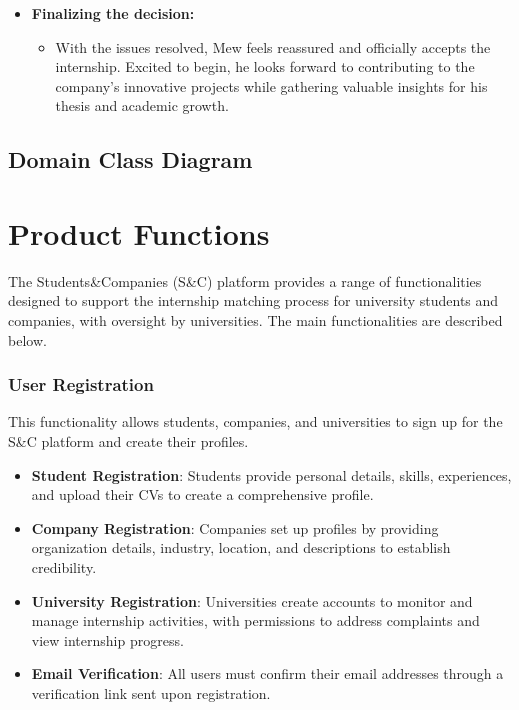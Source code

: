 \begin{itemize}[leftmargin=*, label={}]
    \item \textbf{Finalizing the decision:}
    \begin{itemize}
        \item With the issues resolved, Mew feels reassured and officially accepts the internship. Excited to begin, he looks forward to contributing to the company’s innovative projects while gathering valuable insights for his thesis and academic growth.
    \end{itemize}
\end{itemize}


\subsection{Domain Class Diagram}

\section{Product Functions}

The Students\&Companies (S\&C) platform provides a range of functionalities designed to support the internship matching process for university students and companies, with oversight by universities. The main functionalities are described below.

\subsubsection*{User Registration} 
This functionality allows students, companies, and universities to sign up for the S\&C platform and create their profiles.
\begin{itemize}
    \item \textbf{Student Registration}: Students provide personal details, skills, experiences, and upload their CVs to create a comprehensive profile.
    \item \textbf{Company Registration}: Companies set up profiles by providing organization details, industry, location, and descriptions to establish credibility.
    \item \textbf{University Registration}: Universities create accounts to monitor and manage internship activities, with permissions to address complaints and view internship progress.
    \item \textbf{Email Verification}: All users must confirm their email addresses through a verification link sent upon registration.
\end{itemize}


